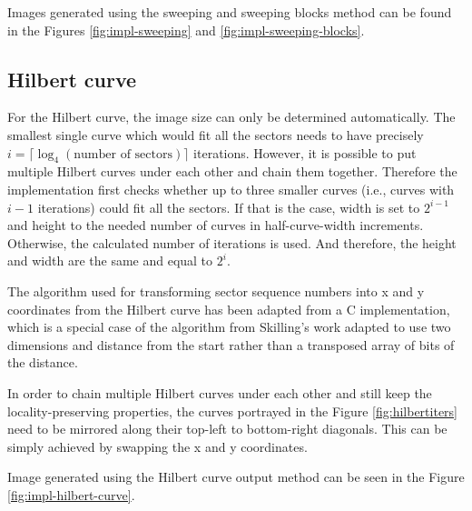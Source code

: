 \documentclass[
  digital, %
  color,   %
  oneside, %
  lof,     %
  nolot,     %
]{fithesis4}
\begin{document}
Images generated using the sweeping and sweeping blocks method can be found in the Figures \ref{fig:impl-sweeping} and \ref{fig:impl-sweeping-blocks}.

\subsection{Hilbert curve}
\label{ssec:hilbert-curve}

For the Hilbert curve, the image size can only be determined automatically.
The smallest single curve which would fit all the sectors needs to have precisely $i = \lceil\log_4(\text{number of sectors})\rceil$ iterations.
However, it is possible to put multiple Hilbert curves under each other and chain them together.
Therefore the implementation first checks whether up to three smaller curves (i.e., curves with $i - 1$ iterations) could fit all the sectors.
If that is the case, width is set to $2^{i - 1}$ and height to the needed number of curves in half-curve-width increments.
Otherwise, the calculated number of iterations is used.
And therefore, the height and width are the same and equal to $2^i$.


The algorithm used for transforming sector sequence numbers into x and y coordinates from the Hilbert curve has been adapted from a C implementation,\cite{wikihilbert} which is a special case of the algorithm from Skilling's work\cite{skilling04} adapted to use two dimensions and distance from the start rather than a transposed array of bits of the distance.

In order to chain multiple Hilbert curves under each other and still keep the locality-preserving properties, the curves portrayed in the Figure \ref{fig:hilbertiters} need to be mirrored along their top-left to bottom-right diagonals.
This can be simply achieved by swapping the x and y coordinates.

Image generated using the Hilbert curve output method can be seen in the Figure \ref{fig:impl-hilbert-curve}.
\end{document}
